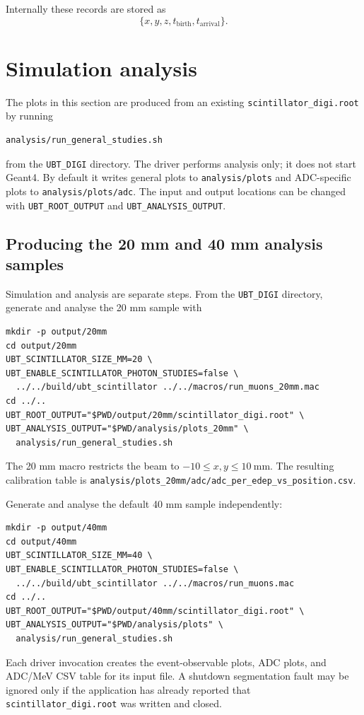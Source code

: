 \begin{technicaldetails}
Internally these records are stored as
\[
\{x, y, z, t_\mathrm{birth}, t_\mathrm{arrival}\}.
\]
\end{technicaldetails}

\section{Simulation analysis}
\label{sec:analysis-plots}

\begin{technicaldetails}
The plots in this section are produced from an existing
\texttt{scintillator\_digi.root} by running
\begin{verbatim}
analysis/run_general_studies.sh
\end{verbatim}
from the \texttt{UBT\_DIGI} directory.  The driver performs analysis only; it
does not start Geant4.  By default it writes general plots to
\texttt{analysis/plots} and ADC-specific plots to
\texttt{analysis/plots/adc}.  The input and output locations can be changed
with \texttt{UBT\_ROOT\_OUTPUT} and \texttt{UBT\_ANALYSIS\_OUTPUT}.
\end{technicaldetails}

\subsection{Producing the 20 mm and 40 mm analysis samples}

\begin{technicaldetails}
Simulation and analysis are separate steps.  From the
\texttt{UBT\_DIGI} directory, generate and analyse the 20 mm sample with
\begin{verbatim}
mkdir -p output/20mm
cd output/20mm
UBT_SCINTILLATOR_SIZE_MM=20 \
UBT_ENABLE_SCINTILLATOR_PHOTON_STUDIES=false \
  ../../build/ubt_scintillator ../../macros/run_muons_20mm.mac
cd ../..
UBT_ROOT_OUTPUT="$PWD/output/20mm/scintillator_digi.root" \
UBT_ANALYSIS_OUTPUT="$PWD/analysis/plots_20mm" \
  analysis/run_general_studies.sh
\end{verbatim}
The 20 mm macro restricts the beam to
\(-10\leq x,y\leq10~\mathrm{mm}\).  The resulting calibration table is
\texttt{analysis/plots\_20mm/adc/adc\_per\_edep\_vs\_position.csv}.

Generate and analyse the default 40 mm sample independently:
\begin{verbatim}
mkdir -p output/40mm
cd output/40mm
UBT_SCINTILLATOR_SIZE_MM=40 \
UBT_ENABLE_SCINTILLATOR_PHOTON_STUDIES=false \
  ../../build/ubt_scintillator ../../macros/run_muons.mac
cd ../..
UBT_ROOT_OUTPUT="$PWD/output/40mm/scintillator_digi.root" \
UBT_ANALYSIS_OUTPUT="$PWD/analysis/plots" \
  analysis/run_general_studies.sh
\end{verbatim}
Each driver invocation creates the event-observable plots, ADC plots, and
ADC/MeV CSV table for its input file.  A shutdown segmentation fault may be
ignored only if the application has already reported that
\texttt{scintillator\_digi.root} was written and closed.
\end{technicaldetails}

